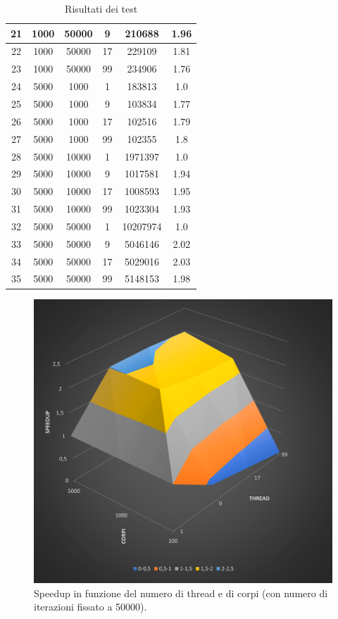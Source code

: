 \documentclass[12pt,a4paper,openright,twoside]{book}
\begin{document}
\begin{center}
\begin{table}
\begin{tabular}{ |c|c|c|c|c|c| }
			\hline
		   21 & 1000 & 50000 & 9 & 210688 & 1.96 \\ 
			\hline
		   22 & 1000 & 50000 & 17 & 229109 & 1.81 \\ 
			\hline
		   23 & 1000 & 50000 & 99 & 234906 & 1.76 \\ 
			\hline
		   24 & 5000 & 1000 & 1 & 183813 & 1.0 \\ 
			\hline
		   25 & 5000 & 1000 & 9 & 103834 & 1.77 \\ 
			\hline
		   26 & 5000 & 1000 & 17 & 102516 & 1.79 \\ 
			\hline
		   27 & 5000 & 1000 & 99 & 102355 & 1.8 \\ 
			\hline
		   28 & 5000 & 10000 & 1 & 1971397 & 1.0 \\ 
			\hline
		   29 & 5000 & 10000 & 9 & 1017581 & 1.94 \\ 
			\hline
		   30 & 5000 & 10000 & 17 & 1008593 & 1.95 \\ 
			\hline
		   31 & 5000 & 10000 & 99 & 1023304 & 1.93 \\ 
			\hline
		   32 & 5000 & 50000 & 1 & 10207974 & 1.0 \\ 
			\hline
		   33 & 5000 & 50000 & 9 & 5046146 & 2.02 \\ 
			\hline
		   34 & 5000 & 50000 & 17 & 5029016 & 2.03 \\ 
			\hline
		   35 & 5000 & 50000 & 99 & 5148153 & 1.98 \\ 
			\hline
		\end{tabular}
		\label{tab:table1}
		\caption{Risultati dei test}
	\end{table}
\end{center}

\begin{figure}
	\centering
	\includegraphics[width=\linewidth]{figures/speedup-plot.png}
	\caption{Speedup in funzione del numero di thread e di corpi (con numero di iterazioni fissato a 50000).}
	\label{fig:speedup}
\end{figure}
\end{document}
